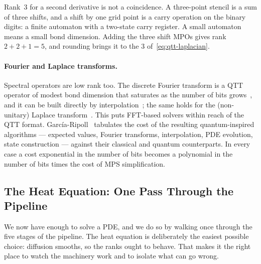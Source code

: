\begin{remark}
  Rank~3 for a second derivative is not a coincidence. A three-point stencil is
  a sum of three shifts, and a shift by one grid point is a carry operation on
  the binary digits: a finite automaton with a two-state carry register.
  A small automaton means a small bond dimension. Adding the three shift MPOs
  gives rank $2+2+1 = 5$, and rounding brings it to the $3$
  of~\eqref{eq:qtt-laplacian}.
\end{remark}

\paragraph{Fourier and Laplace transforms.}
Spectral operators are low rank too. The discrete Fourier transform is a QTT
operator of modest bond dimension that saturates as the number of bits
grows~\cite{Chen2023}, and it can be built directly by
interpolation~\cite{Chen2025}; the same holds for the (non-unitary) Laplace
transform~\cite{Jaseem2026}. This puts FFT-based solvers within reach of the
QTT format.
García-Ripoll~\cite{GarciaRipoll2021} tabulates the cost of the resulting
quantum-inspired algorithms --- expected values, Fourier transforms,
interpolation, PDE evolution, state construction --- against their classical
and quantum counterparts. In every case a cost exponential in the number of bits
becomes a polynomial in the number of bits times the cost of MPS
simplification.

\subsection{The Heat Equation: One Pass Through the Pipeline}
\label{subsec:heat-explicit-euler}

We now have enough to solve a PDE, and we do so by walking once through the
five stages of the pipeline. The heat equation is deliberately the easiest
possible choice: diffusion smooths, so the ranks ought to behave. That makes it
the right place to watch the machinery work and to isolate what can go wrong.

